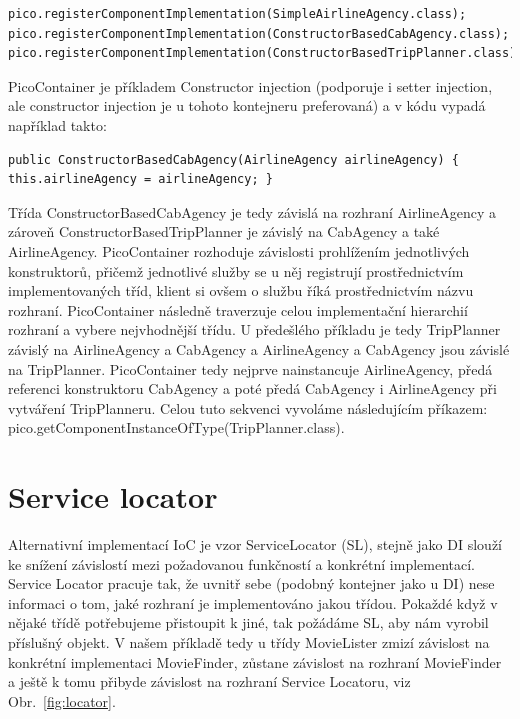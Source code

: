 \documentclass[a4paper,conference]{IEEEtran}
\newcommand{\fig}[1]{Obr.~\ref{fig:#1}}      %
\begin{document}
\lstset{language=Java,caption=Registrace tříd v kontejneru,label=listing:Java}
\begin{lstlisting}
pico.registerComponentImplementation(SimpleAirlineAgency.class); pico.registerComponentImplementation(ConstructorBasedCabAgency.class); pico.registerComponentImplementation(ConstructorBasedTripPlanner.class);
\end{lstlisting}

PicoContainer je příkladem Constructor injection (podporuje i setter injection, ale constructor injection je u tohoto kontejneru preferovaná) a v kódu vypadá například takto:

\lstset{language=Java,caption=Použití PicoContainer,label=listing:Java}
\begin{lstlisting}
public ConstructorBasedCabAgency(AirlineAgency airlineAgency) {  this.airlineAgency = airlineAgency; }
\end{lstlisting}

Třída ConstructorBasedCabAgency je tedy závislá na rozhraní AirlineAgency a zároveň ConstructorBasedTripPlanner je závislý na CabAgency a také AirlineAgency.
PicoContainer rozhoduje závislosti prohlížením jednotlivých konstruktorů, přičemž jednotlivé služby se u něj registrují prostřednictvím implementovaných tříd, klient si ovšem o službu říká prostřednictvím názvu rozhraní. PicoContainer následně traverzuje celou implementační hierarchií rozhraní a vybere nejvhodnější třídu.
U předešlého příkladu je tedy TripPlanner závislý na AirlineAgency a CabAgency a AirlineAgency a CabAgency jsou závislé na TripPlanner. PicoContainer tedy nejprve nainstancuje AirlineAgency, předá referenci konstruktoru CabAgency a poté předá CabAgency i AirlineAgency při vytváření TripPlanneru. Celou tuto sekvenci vyvoláme následujícím příkazem: pico.getComponentInstanceOfType(TripPlanner.class).

\section{Service locator}

Alternativní implementací IoC je vzor ServiceLocator (SL), stejně jako DI slouží ke snížení závislostí mezi požadovanou funkčností a konkrétní implementací. Service Locator pracuje tak, že uvnitř sebe (podobný kontejner jako u DI) nese informaci o tom, jaké rozhraní je implementováno jakou třídou. Pokaždé když v nějaké třídě potřebujeme přistoupit k jiné, tak požádáme SL, aby nám vyrobil příslušný objekt. V našem příkladě tedy u třídy MovieLister zmizí závislost na konkrétní implementaci MovieFinder, zůstane závislost na rozhraní MovieFinder a ještě k tomu přibyde závislost na rozhraní Service Locatoru, viz \fig{locator}.
\end{document}
